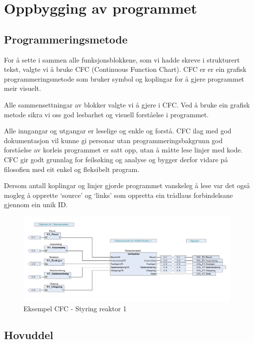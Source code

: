 \newpage
\section{Oppbygging av programmet}
\thispagestyle{fancy}

\subsection{Programmeringsmetode}
For å sette i sammen alle funksjonsblokkene, som vi hadde skreve i strukturert tekst, valgte vi å bruke  CFC (Continuous Function Chart).
CFC er er ein grafisk programmeringsmetode som bruker symbol og koplingar for å gjere programmet  meir visuelt.

Alle sammensettningar av blokker valgte vi å gjere i CFC. Ved å bruke ein grafisk metode sikra vi oss god lesbarhet og
visuell forståelse i programmet. 

Alle inngangar og utgangar er leselige og enkle og forstå. CFC ilag med god dokumentasjon vil kunne gi personar utan programmeringsbakgrunn
god forståelse av korleis programmet er satt opp, utan å måtte lese linjer med kode.
CFC gir godt grunnlag for feilsøking og analyse og bygger derfor vidare på filosofien med eit enkel og fleksibelt program.

Dersom antall koplingar og linjer gjorde programmet vanskeleg å lese var det også
mogleg å opprette `source' og `links' som oppretta ein trådlaus forbindelsane gjennom ein unik ID.


\begin{figure}[htbp]
    \centering
    \includegraphics[width=1\textwidth]{Bilder/ReaktorPRG.png}
    \caption{Eksempel CFC - Styring reaktor 1}\label{fig:CFCReaktor}
\end{figure}

\newpage

\subsection{Hovuddel}

